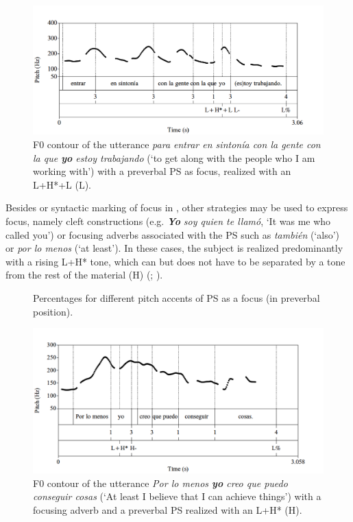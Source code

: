 \documentclass[output=paper]{langsci/langscibook}
\begin{document}
\begin{figure}
\includegraphics[width=\textwidth]{figures/pes-img10.png}
\caption{F0 contour of the utterance \textit{para entrar en sintonía con la gente con la que \textbf{yo} estoy trabajando} (‘to get along with the people who I am working with’) with a preverbal PS as focus, realized with an L+H*+L (L\textminus{}).} 
\label{fig:pes:10}
\end{figure}

Besides  or syntactic marking of focus in , other strategies may be used to express focus, namely cleft constructions (e.g. \textbf{\textit{Yo}} \textit{soy quien te llamó}, ‘It was me who called you’) or focusing adverbs associated with the PS such as \textit{también} (‘also’)  or \textit{por lo menos} (‘at least’). In these cases, the subject is realized predominantly with a rising L+H* tone, which can but does not have to be separated by a  tone from the rest of the material (H\textminus{}) (; ). 

\begin{figure}
\caption{Percentages for different pitch accents of PS as a focus (in preverbal position).}
\label{fig:pes:11}
\end{figure}

  
\begin{figure}
\includegraphics[width=\textwidth]{figures/pes-img12.png}
\caption{F0 contour of the utterance \textit{Por lo menos \textbf{yo} creo que puedo conseguir cosas} (‘At least I believe that I can achieve things’) with a focusing adverb and a preverbal PS realized with an L+H* (H\textminus{}).\label{fig:pes:12}}
\end{figure}
\end{document}
